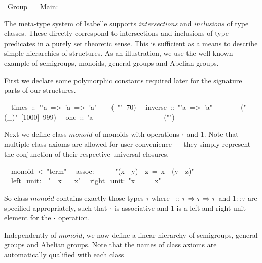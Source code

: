 \begin{isabelle}%
%
\ Group\ =\ Main:%
\begin{isamarkuptext}%
\medskip\noindent The meta-type system of Isabelle supports
 \emph{intersections} and \emph{inclusions} of type classes. These
 directly correspond to intersections and inclusions of type
 predicates in a purely set theoretic sense. This is sufficient as a
 means to describe simple hierarchies of structures.  As an
 illustration, we use the well-known example of semigroups, monoids,
 general groups and Abelian groups.%
\end{isamarkuptext}%
%
%
\begin{isamarkuptext}%
First we declare some polymorphic constants required later for the
 signature parts of our structures.%
\end{isamarkuptext}%
\isanewline
\ \ times\ ::\ {"}'a\ =>\ 'a\ =>\ 'a{"}\ \ \ \ (\ {"}{\isasymOtimes}{"}\ 70)\isanewline
\ \ inverse\ ::\ {"}'a\ =>\ 'a{"}\ \ \ \ \ \ \ \ ({"}(\_{\isasyminv}){"}\ [1000]\ 999)\isanewline
\ \ one\ ::\ 'a\ \ \ \ \ \ \ \ \ \ \ \ \ \ \ \ \ \ \ \ ({"}{\isasymunit}{"})%
\begin{isamarkuptext}%
\noindent Next we define class $monoid$ of monoids with operations
 $\cdot$ and $1$.  Note that multiple class axioms are allowed for
 user convenience --- they simply represent the conjunction of their
 respective universal closures.%
\end{isamarkuptext}%
\isanewline
\ \ monoid\ <\ {"}term{"}\isanewline
\ \ assoc:\ \ \ \ \ \ {"}(x\ {\isasymOtimes}\ y)\ {\isasymOtimes}\ z\ =\ x\ {\isasymOtimes}\ (y\ {\isasymOtimes}\ z){"}\isanewline
\ \ left\_unit:\ \ {"}{\isasymunit}\ {\isasymOtimes}\ x\ =\ x{"}\isanewline
\ \ right\_unit:\ {"}x\ {\isasymOtimes}\ {\isasymunit}\ =\ x{"}%
\begin{isamarkuptext}%
\noindent So class $monoid$ contains exactly those types $\tau$ where
 $\cdot :: \tau \Rightarrow \tau \Rightarrow \tau$ and $1 :: \tau$ are specified
 appropriately, such that $\cdot$ is associative and $1$ is a left
 and right unit element for the $\cdot$ operation.%
\end{isamarkuptext}%
%
\begin{isamarkuptext}%
\medskip Independently of $monoid$, we now define a linear hierarchy
 of semigroups, general groups and Abelian groups.  Note that the
 names of class axioms are automatically qualified with each class

\end{isamarkuptext}
\end{isabelle}
